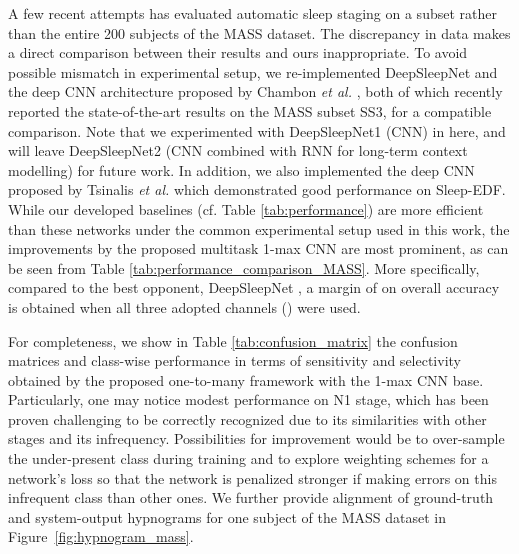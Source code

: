 \documentclass[10pt,twocolumn,twoside]{IEEEtran}
\begin{document}
A few recent attempts has evaluated automatic sleep staging on a subset \cite{Supratak2017,Dong2017,Chambon2018} rather than the entire 200 subjects of the MASS dataset. The discrepancy in data makes a direct comparison between their results and ours inappropriate. To avoid possible mismatch in experimental setup, we re-implemented DeepSleepNet \cite{Supratak2017} and the deep CNN architecture proposed by Chambon \emph{et al.} \cite{Chambon2018}, both of which recently reported the state-of-the-art results on the MASS subset SS3, for a compatible comparison. Note that we experimented with DeepSleepNet1 (CNN) in \cite{Supratak2017} here, and will leave DeepSleepNet2 (CNN combined with RNN for long-term context modelling) for future work. In addition, we also implemented the deep CNN proposed by Tsinalis \emph{et al.} \cite{Tsinalis2016} which demonstrated good performance on Sleep-EDF.
While our developed baselines (cf. Table \ref{tab:performance}) are more efficient than these networks under the common experimental setup used in this work, the improvements by the proposed multitask 1-max CNN are most prominent, as can be seen from Table \ref{tab:performance_comparison_MASS}. More specifically, compared to the best opponent, DeepSleepNet \cite{Supratak2017}, a margin of  on overall accuracy is obtained when all three adopted channels () were used.
	
For completeness, we show in Table \ref{tab:confusion_matrix} the confusion matrices and class-wise performance in terms of sensitivity and selectivity \cite{Imtiaz2014} obtained by the proposed one-to-many framework with the 1-max CNN base. Particularly, one may notice modest performance on N1 stage, which has been proven challenging to be correctly recognized \cite{Phan2018c, Phan2018d, Supratak2017,Tsinalis2016} due to its similarities with other stages and its infrequency. Possibilities for improvement would be to over-sample the under-present class during training and to explore weighting schemes for a network's loss \cite{phan2018e,Koch2018b} so that the network is penalized stronger if making errors on this infrequent class than other ones. We further provide alignment of ground-truth and system-output hypnograms for one subject of the MASS dataset in Figure~\ref{fig:hypnogram_mass}.
\end{document}
